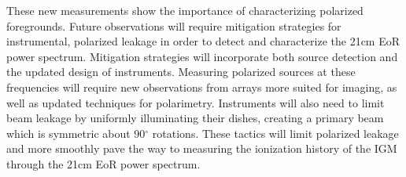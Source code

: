 \begin{partChapter}
These new measurements show the importance of characterizing polarized foregrounds. Future
observations will require mitigation strategies for instrumental, polarized leakage in order to
detect and characterize the 21cm EoR power spectrum. Mitigation strategies will incorporate both
source detection and the updated design of instruments. Measuring polarized sources at these
frequencies will require new observations from arrays more suited for imaging, as well as updated
techniques for polarimetry. Instruments will also need to limit beam leakage by uniformly
illuminating their dishes, creating a primary beam which is symmetric about 90$^\circ$ rotations.
These tactics will limit polarized leakage and more smoothly pave the way to measuring the
ionization history of the IGM through the 21cm EoR power spectrum. 

\end{partChapter}
